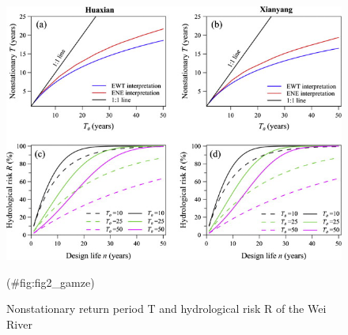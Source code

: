 \documentclass[
]{krantz}
\begin{document}
\begin{figure}

{\centering \includegraphics[width=0.8\linewidth]{./work/06-lowflow/figures/Figure_2} 

}

\caption{Nonstationary return period T and hydrological risk R of the Wei River}(\#fig:fig2\_gamze)
\end{figure}
\end{document}
